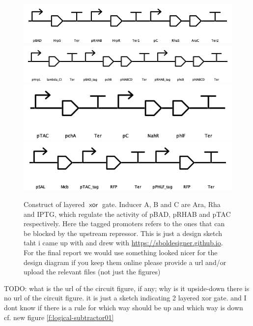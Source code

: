 \documentclass[12pt,notitlepage]{article}
\newcommand{\TODO}[1]{\textrm{\color{red}TODO: #1}}
\newcommand{\XOR}{\ensuremath{\mathop{\mathsf{xor}}}\xspace}
\newcommand{\hh}[1]{{\color{Purple}#1}}
\newcommand{\ra}[1]{{\color{Blue}#1}}
\begin{document}
\begin{figure}
    \centering
    \includegraphics[width = \linewidth]{images/gene_circuits_xor/P1.png}
    \includegraphics[width = \linewidth]{images/gene_circuits_xor/P2.png}
    \includegraphics[width = \linewidth]{images/gene_circuits_xor/P3.png}
    \includegraphics[width = \linewidth]{images/gene_circuits_xor/P4.png}
    \caption{Construct of layered \XOR gate. Inducer A, B and C are Ara, Rha and IPTG, which regulate the activity of pBAD, pRHAB and pTAC respectively. Here the tagged promoters refers to the ones that can be blocked by the upstream repressor. \hh{This is just a design sketch taht i came up with and drew with \url{https://sboldesigner.github.io}. For the final report we would use something looked nicer for the design diagram}
    \ra{if you keep them online please provide a url and/or upload the relevant files (not just the figures)}
    }
    \label{f:gene_circuit_xor}
\end{figure}


\TODO{
what is the url of the circuit figure, if any; why is it upside-down
\hh{there is no url of the circuit figure. it is just a sketch indicating 2 layered xor gate. and I dont know if there is a rule for which way should be up and which way is down}
\ra{cf. new figure \ref{f:logical-subtractor01}}
}
\end{document}
